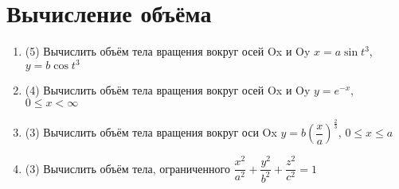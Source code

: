 \documentclass[9pt, a4paper]{extarticle}
\numberwithin{equation}{section}
\numberwithin{lemma}{section}
\numberwithin{definition}{section}
\numberwithin{notabene}{section}
\numberwithin{corollary}{section}
\begin{document}
	\section{Вычисление объёма}
	\begin{enumerate}
		\item (5) Вычислить объём тела вращения вокруг осей Ox и Oy $x = a \sin{t}^3$, $y = b \cos{t}^3$
		\item (4) Вычислить объём тела вращения вокруг осей Ox и Oy $ y = e^{-x}$, $ 0 \leq x < \infty$
		\item (3) Вычислить объём тела вращения вокруг оси Ox $y = b\left(\dfrac{x}{a}\right)^{\frac23}$, $0 \leq x \leq a$
		\item (3) Вычислить объём тела, ограниченного $\dfrac{x^2}{a^2}+\dfrac{y^2}{b^2}+\dfrac{z^2}{c^2} = 1$
	\end{enumerate}
\end{document}

